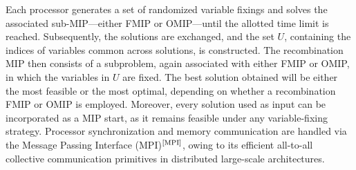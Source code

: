 Each processor generates a set of randomized variable fixings and solves the associated sub-MIP—either FMIP or OMIP—until the allotted time limit is reached.
Subsequently, the solutions are exchanged, and the set $U$, containing the indices of variables common across solutions, is constructed. The recombination MIP then consists of a subproblem, again associated with either FMIP or OMIP, in which the variables in $U$ are fixed.
The best solution obtained will be either the most feasible or the most optimal, depending on whether a recombination FMIP or OMIP is employed. Moreover, every solution used as input can be incorporated as a MIP start, as it remains feasible under any variable-fixing strategy.
Processor synchronization and memory communication are handled via the Message Passing Interface (MPI)$^\text{\cite{MPI}}$, owing to its efficient all-to-all collective communication primitives in distributed large-scale architectures.

